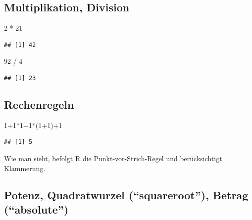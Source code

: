\documentclass[
]{book}
\newenvironment{Shaded}{\begin{snugshade}}{\end{snugshade}}
\newcommand{\DecValTok}[1]{\textcolor[rgb]{0.00,0.00,0.81}{#1}}
\newcommand{\NormalTok}[1]{#1}
\newcommand{\SpecialCharTok}[1]{\textcolor[rgb]{0.00,0.00,0.00}{#1}}
\begin{document}
\hypertarget{multiplikation-division}{%
\subsection*{Multiplikation, Division}\label{multiplikation-division}}

\begin{Shaded}
\begin{Highlighting}[]
\DecValTok{2} \SpecialCharTok{*} \DecValTok{21}   
\end{Highlighting}
\end{Shaded}

\begin{verbatim}
## [1] 42
\end{verbatim}

\begin{Shaded}
\begin{Highlighting}[]
\DecValTok{92} \SpecialCharTok{/} \DecValTok{4}
\end{Highlighting}
\end{Shaded}

\begin{verbatim}
## [1] 23
\end{verbatim}

\hypertarget{rechenregeln}{%
\subsection*{Rechenregeln}\label{rechenregeln}}

\begin{Shaded}
\begin{Highlighting}[]
\DecValTok{1}\SpecialCharTok{+}\DecValTok{1}\SpecialCharTok{*}\DecValTok{1}\SpecialCharTok{+}\DecValTok{1}\SpecialCharTok{*}\NormalTok{(}\DecValTok{1}\SpecialCharTok{+}\DecValTok{1}\NormalTok{)}\SpecialCharTok{+}\DecValTok{1}
\end{Highlighting}
\end{Shaded}

\begin{verbatim}
## [1] 5
\end{verbatim}

Wie man sieht, befolgt R die Punkt-vor-Strich-Regel und berücksichtigt Klammerung.

\hypertarget{potenz-quadratwurzel-squareroot-betrag-absolute}{%
\subsection*{Potenz, Quadratwurzel (``squareroot''), Betrag (``absolute'')}\label{potenz-quadratwurzel-squareroot-betrag-absolute}}
\end{document}
